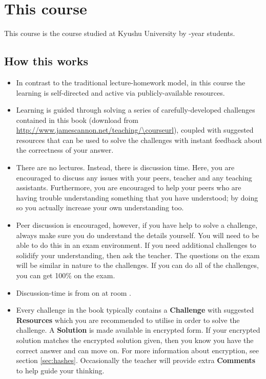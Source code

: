 \section{This course}
This course is the \course course studied at Kyushu University by \nensei-year students.

\subsection{How this works}
\begin{itemize}
    \item In contrast to the traditional lecture-homework model, in this course the learning is self-directed and active via publicly-available resources.
    \item Learning is guided through solving a series of carefully-developed challenges contained in this book (download from \url{http://www.jamescannon.net/teaching/\courseurl}), coupled with suggested resources that can be used to solve the challenges with instant feedback about the correctness of your answer.
    \item There are no lectures. Instead, there is discussion time. Here, you are encouraged to discuss any issues with your peers, teacher and any teaching assistants. Furthermore, you are encouraged to help your peers who are having trouble understanding something that you have understood; by doing so you actually increase your own understanding too.
    \item Peer discussion is encouraged, however, if you have help to solve a challenge, always make sure you do understand the details yourself. You will need to be able to do this in an exam environment. If you need additional challenges to solidify your understanding, then ask the teacher. The questions on the exam will be similar in nature to the challenges. If you can do all of the challenges, you can get 100\% on the exam.
    \item Discussion-time is from \disctime on \discdays at room \discroom.
    \item Every challenge in the book typically contains a \textbf{Challenge} with suggested \textbf{Resources} which you are recommended to utilise in order to solve the challenge. A \textbf{Solution} is made available in encrypted form. If your encrypted solution matches the encrypted solution given, then you know you have the correct answer and can move on. For more information about encryption, see section \ref{sec:hashes}. Occasionally the teacher will provide extra \textbf{Comments} to help guide your thinking.

\end{itemize}
